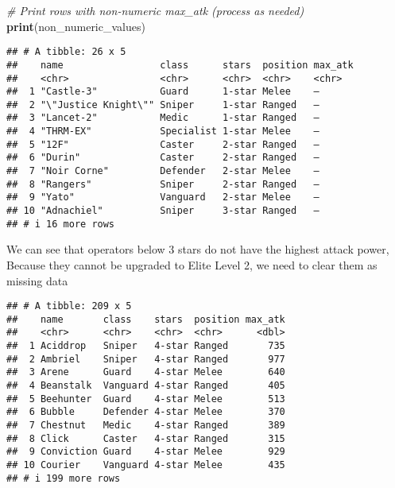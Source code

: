 \documentclass[
]{article}
\newenvironment{Shaded}{\begin{snugshade}}{\end{snugshade}}
\newcommand{\CommentTok}[1]{\textcolor[rgb]{0.56,0.35,0.01}{\textit{#1}}}
\newcommand{\FunctionTok}[1]{\textcolor[rgb]{0.13,0.29,0.53}{\textbf{#1}}}
\newcommand{\NormalTok}[1]{#1}
\newcommand{\OtherTok}[1]{\textcolor[rgb]{0.56,0.35,0.01}{#1}}
\newcommand{\SpecialCharTok}[1]{\textcolor[rgb]{0.81,0.36,0.00}{\textbf{#1}}}
\begin{document}
\begin{Shaded}
\begin{Highlighting}[]
\CommentTok{\# Print rows with non{-}numeric max\_atk (process as needed)}
\FunctionTok{print}\NormalTok{(non\_numeric\_values)}
\end{Highlighting}
\end{Shaded}

\begin{verbatim}
## # A tibble: 26 x 5
##    name                 class      stars  position max_atk
##    <chr>                <chr>      <chr>  <chr>    <chr>  
##  1 "Castle-3"           Guard      1-star Melee    –      
##  2 "\"Justice Knight\"" Sniper     1-star Ranged   –      
##  3 "Lancet-2"           Medic      1-star Ranged   –      
##  4 "THRM-EX"            Specialist 1-star Melee    –      
##  5 "12F"                Caster     2-star Ranged   –      
##  6 "Durin"              Caster     2-star Ranged   –      
##  7 "Noir Corne"         Defender   2-star Melee    –      
##  8 "Rangers"            Sniper     2-star Ranged   –      
##  9 "Yato"               Vanguard   2-star Melee    –      
## 10 "Adnachiel"          Sniper     3-star Ranged   –      
## # i 16 more rows
\end{verbatim}

We can see that operators below 3 stars do not have the highest attack
power, Because they cannot be upgraded to Elite Level 2, we need to
clear them as missing data

\begin{Shaded}
\end{Shaded}

\begin{verbatim}
## # A tibble: 209 x 5
##    name       class    stars  position max_atk
##    <chr>      <chr>    <chr>  <chr>      <dbl>
##  1 Aciddrop   Sniper   4-star Ranged       735
##  2 Ambriel    Sniper   4-star Ranged       977
##  3 Arene      Guard    4-star Melee        640
##  4 Beanstalk  Vanguard 4-star Ranged       405
##  5 Beehunter  Guard    4-star Melee        513
##  6 Bubble     Defender 4-star Melee        370
##  7 Chestnut   Medic    4-star Ranged       389
##  8 Click      Caster   4-star Ranged       315
##  9 Conviction Guard    4-star Melee        929
## 10 Courier    Vanguard 4-star Melee        435
## # i 199 more rows
\end{verbatim}
\end{document}
